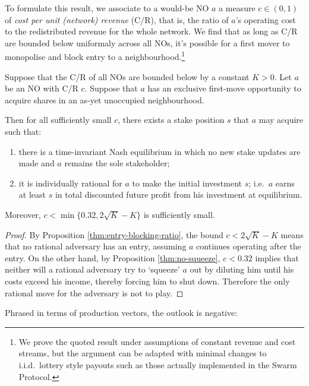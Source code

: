 To formulate this result, we associate to a would-be NO $a$ a measure $c\in(0,1)$ of \emph{cost per unit (network) revenue} (C/R), that is, the ratio of $a$'s operating cost to the redistributed revenue for the whole network.
%
We find that as long as C/R are bounded below uniformaly across all NOs, it's possible for a first mover to monopolise and block entry to a neighbourhood.\footnote{We prove the quoted result under assumptions of constant revenue and cost streams, but the argument can be adapted with minimal changes to i.i.d.~lottery style payouts such as those actually implemented in the Swarm Protocol.}

\begin{theorem}
  \label{thm:block-entry}

  Suppose that the C/R of all NOs are bounded below by a constant $K>0$.
  Let $a$ be an NO with C/R $c$. 
  Suppose that $a$ has an exclusive first-move opportunity to acquire shares in an as-yet unoccupied neighbourhood.
  
  Then for all sufficiently small $c$, there exists a stake position $s$ that $a$ may acquire such that:
  \begin{enumerate}
    \item there is a time-invariant Nash equilibrium in which no new stake updates are made and $a$ remains the sole stakeholder;
    \item it is individually rational for $a$ to make the initial investment $s$; i.e.~$a$ earns at least $s$ in total discounted future profit from his investment at equilibrium.
  \end{enumerate}
  Moreover, $c < \min\{0.32, 2\sqrt{K}-K\}$ is sufficiently small.

\end{theorem}
%
\begin{proof}

  By Proposition \ref{thm:entry-blocking-ratio}, the bound $c<2\sqrt{K}-K$ means that no rational adversary has an entry, assuming $a$ continues operating after the entry.
  On the other hand, by Proposition \ref{thm:no-squeeze}, $c<0.32$ implies that neither will a rational adversary try to `squeeze' $a$ out by diluting him until his costs exceed his income, thereby forcing him to shut down.
  Therefore the only rational move for the adversary is not to play. \qedhere

\end{proof}

Phrased in terms of production vectors, the outlook is negative:

